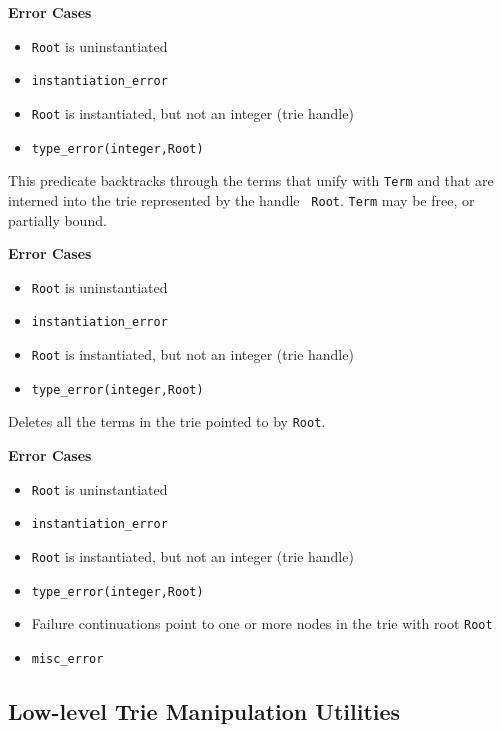 {\begin{description}
{\bf Error Cases}
\begin{itemize}
\item 	{\tt Root} is uninstantiated
\bi
\item 	 {\tt instantiation\_error}
\ei
\item 	{\tt Root} is instantiated, but not an integer (trie handle)
\bi
\item 	 {\tt type\_error(integer,Root)}
\ei
\end{itemize}

This predicate backtracks through the terms that unify with {\tt Term}
and that are interned into the trie represented by the handle {\tt
  Root}.  {\tt Term} may be free, or partially bound.

{\bf Error Cases}
\begin{itemize}
\item 	{\tt Root} is uninstantiated
\bi
\item 	 {\tt instantiation\_error}
\ei
\item 	{\tt Root} is instantiated, but not an integer (trie handle)
\bi
\item 	 {\tt type\_error(integer,Root)}
\ei
\end{itemize}

 
Deletes all the terms in the trie pointed to by {\tt Root}.

{\bf Error Cases}
\begin{itemize}
\item 	{\tt Root} is uninstantiated
\bi
\item 	 {\tt instantiation\_error}
\ei
\item 	{\tt Root} is instantiated, but not an integer (trie handle)
\bi
\item 	 {\tt type\_error(integer,Root)}
\ei
\item 	Failure continuations point to one or more nodes in the trie with root {\tt Root}
\bi
\item 	{\tt misc\_error}
\ei
\end{itemize}
\end{description}


\subsection{Low-level Trie Manipulation Utilities} \label{sec:intern-advanced}

}

